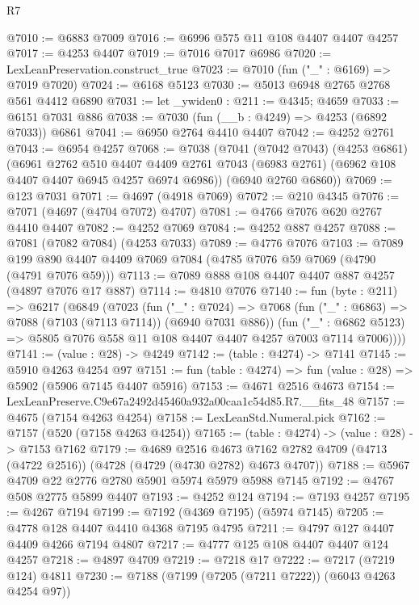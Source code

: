 \begin{lexlean}{R7}
\begin{coremodule}
@7010 := @6883 @7009
@7016 := @6996 @575 @11 @108 @4407 @4407 @4257
@7017 := @4253 @4407
@7019 := @7016 @7017 @6986
@7020 := LexLeanPreservation.construct_true
@7023 := @7010 (fun ("_" : @6169) => @7019 @7020)
@7024 := @6168 @5123
@7030 := @5013 @6948 @2765 @2768 @561 @4412 @6890
@7031 := let _ywiden0 : @211 := @4345; @4659
@7033 := @6151 @7031 @886
@7038 := @7030 (fun (__b : @4249) => @4253 (@6892 @7033)) @6861
@7041 := @6950 @2764 @4410 @4407
@7042 := @4252 @2761
@7043 := @6954 @4257
@7068 := @7038
    (@7041
      (@7042 @7043)
      (@4253 @6861)
      (@6961
        @2762
        @510
        @4407
        @4409
        @2761
        @7043
        (@6983 @2761)
        (@6962 @108 @4407 @4407 @6945 @4257 @6974 @6986))
      (@6940 @2760 @6860))
@7069 := @123 @7031
@7071 := @4697 (@4918 @7069)
@7072 := @210 @4345
@7076 := @7071 (@4697 (@4704 @7072) @4707)
@7081 := @4766 @7076 @620 @2767 @4410 @4407
@7082 := @4252 @7069
@7084 := @4252 @887 @4257
@7088 := @7081 (@7082 @7084) (@4253 @7033)
@7089 := @4776 @7076
@7103 := @7089 @199 @890 @4407 @4409 @7069 @7084 (@4785 @7076 @59 @7069 (@4790 (@4791 @7076 @59)))
@7113 := @7089 @888 @108 @4407 @4407 @887 @4257 (@4897 @7076 @17 @887)
@7114 := @4810 @7076
@7140 := fun (byte : @211) =>
  @6217
    (@6849
      (@7023
        (fun ("_" : @7024) =>
        @7068
          (fun ("_" : @6863) => @7088 (@7103 (@7113 @7114)) (@6940 @7031 @886))
          (fun ("_" : @6862 @5123) =>
          @5805 @7076 @558 @11 @108 @4407 @4407 @4257 @7003 @7114 @7006))))
@7141 := (value : @28) -> @4249
@7142 := (table : @4274) -> @7141
@7145 := @5910 @4263 @4254 @97
@7151 := fun (table : @4274) => fun (value : @28) => @5902 (@5906 @7145 @4407 @5916)
@7153 := @4671 @2516 @4673
@7154 := LexLeanPreserve.C9e67a2492d45460a932a00caa1c54d85.R7.__fits_48
@7157 := @4675 (@7154 @4263 @4254)
@7158 := LexLeanStd.Numeral.pick
@7162 := @7157 (@520 (@7158 @4263 @4254))
@7165 := (table : @4274) -> (value : @28) -> @7153 @7162
@7179 := @4689
    @2516
    @4673
    @7162
    @2782
    @4709
    (@4713 (@4722 @2516))
    (@4728 (@4729 (@4730 @2782) @4673 @4707))
@7188 := @5967 @4709 @22 @2776 @2780 @5901 @5974 @5979 @5988 @7145
@7192 := @4767 @508 @2775 @5899 @4407
@7193 := @4252 @124
@7194 := @7193 @4257
@7195 := @4267 @7194
@7199 := @7192 (@4369 @7195) (@5974 @7145)
@7205 := @4778 @128 @4407 @4410 @4368 @7195 @4795
@7211 := @4797 @127 @4407 @4409 @4266 @7194 @4807
@7217 := @4777 @125 @108 @4407 @4407 @124 @4257
@7218 := @4897 @4709
@7219 := @7218 @17
@7222 := @7217 (@7219 @124) @4811
@7230 := @7188 (@7199 (@7205 (@7211 @7222)) (@6043 @4263 @4254 @97))

\end{coremodule}
\end{lexlean}
